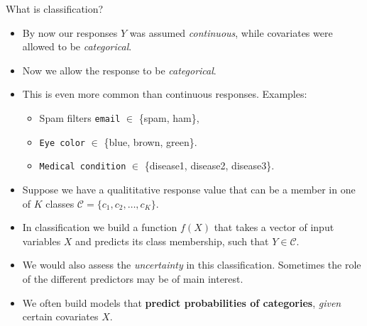 \documentclass[
  10pt,
  ignorenonframetext,
]{beamer}
\providecommand{\tightlist}{%
  \setlength{\itemsep}{0pt}\setlength{\parskip}{0pt}}
\begin{document}
\begin{frame}[fragile]{What is classification?}
\protect\hypertarget{what-is-classification}{}
\vspace{3mm}

\begin{itemize}
\item
  By now our responses \(Y\) was assumed \emph{continuous}, while
  covariates were allowed to be \emph{categorical}. \vspace{1mm}
\item
  Now we allow the response to be \emph{categorical}. \vspace{1mm}
\item
  This is even more common than continuous responses. Examples:

  \begin{itemize}
  \tightlist
  \item
    Spam filters \texttt{email} \(\in\) \{spam, ham\},
  \item
    \texttt{Eye\ color} \(\in\) \{blue, brown, green\}.
  \item
    \texttt{Medical\ condition} \(\in\) \{disease1, disease2,
    disease3\}.
  \end{itemize}
\end{itemize}
\end{frame}

\begin{frame}
\begin{itemize}
\item
  Suppose we have a qualititative response value that can be a member in
  one of \(K\) classes \(\mathcal{C} = \{c_1, c_2, \ldots , c_K\}\).
\item
  In classification we build a function \(f(X)\) that takes a vector of
  input variables \(X\) and predicts its class membership, such that
  \(Y \in \mathcal{C}\).
\item
  We would also assess the \emph{uncertainty} in this classification.
  Sometimes the role of the different predictors may be of main
  interest.
\item
  We often build models that \textbf{predict probabilities of
  categories}, \emph{given} certain covariates \(X\).
\end{itemize}
\end{frame}
\end{document}
